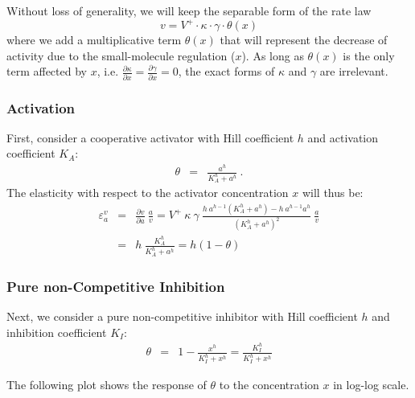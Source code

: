 \documentclass[12pt,a4paper]{article}
\begin{document}
Without loss of generality, we will keep the separable form of the rate law
\[v = V^+ \cdot \kappa \cdot \gamma \cdot \theta(x)\]
where we add a multiplicative term $\theta(x)$ that will represent the decrease of activity due to the small-molecule regulation ($x$). As long as $\theta(x)$ is the only term affected by $x$, i.e. $\frac{\partial \kappa}{\partial x} = \frac{\partial \gamma}{\partial x} = 0$, the exact forms of $\kappa$ and $\gamma$ are irrelevant.

\subsubsection{Activation}
First, consider a cooperative \cite{Barcroft1910-rx, Monod1965-dq} activator with Hill coefficient $h$ and activation coefficient $K_A$:
\begin{eqnarray}
    \theta &=& \frac{a^h}{K_A^h + a^h}~.
\end{eqnarray}
The elasticity with respect to the activator concentration $x$ will thus be:
\begin{eqnarray}
    \varepsilon_a^v &=& \frac{\partial v}{\partial a} ~ \frac{a}{v} = V^+ ~ \kappa ~ \gamma ~ \frac{h~a^{h-1} (K_A^h + a^h) - h~a^{h-1} a^h}{(K_A^h + a^h)^2}~\frac{a}{v} \nonumber \\
    &=& h~\frac{K_A^h}{K_A^h + a^h} = h (1 - \theta) \label{eq:eps_act}
\end{eqnarray}

\subsubsection{Pure non-Competitive Inhibition}
\label{sec:non_conpetitive_inhitibion}
Next, we consider a pure non-competitive inhibitor with Hill coefficient $h$ and inhibition coefficient $K_I$:
\begin{eqnarray}
    \theta &=& 1 - \frac{x^h}{K_I^h + x^h} = \frac{K_I^h}{K_I^h + x^h}
\end{eqnarray}

The following plot shows the response of $\theta$ to the concentration $x$ in log-log scale.

\begin{center}
\end{center}
\end{document}
